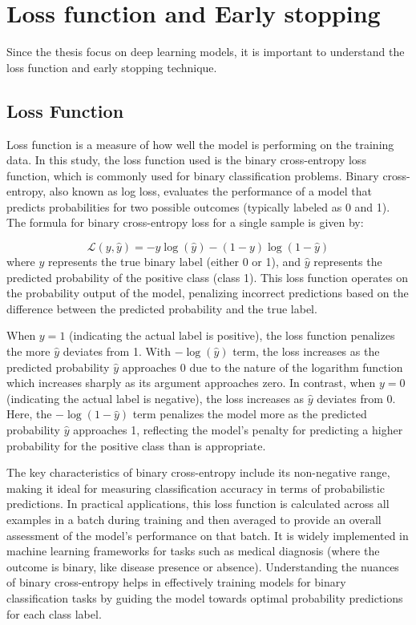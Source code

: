 \documentclass[../main.tex]{subfiles}
\begin{document}
\section{Loss function and Early stopping}

Since the thesis focus on deep learning models, it is important to understand the loss function and early stopping technique.


\subsection{Loss Function}

Loss function is a measure of how well the model is performing on the training data. In this study, the loss function used is the binary cross-entropy loss function, which is commonly used for binary classification problems.
Binary cross-entropy, also known as log loss, evaluates the performance of a model that predicts probabilities for two possible outcomes (typically labeled as 0 and 1). 
The formula for binary cross-entropy loss for a single sample is given by:

\begin{equation}
    \mathcal{L}(y, \hat{y}) = -y \log(\hat{y}) - (1 - y) \log(1 - \hat{y})
\end{equation}
where $y$ represents the true binary label (either 0 or 1), and $\hat{y}$ represents the predicted probability of the positive class (class 1).
This loss function operates on the probability output of the model, penalizing incorrect predictions based on the difference between the predicted probability and the true label.

When $y=1$ (indicating the actual label is positive), the loss function penalizes the more $\hat{y}$ deviates from 1.
With $- \log(\hat{y})$ term, the loss increases as the predicted probability $\hat{y}$ approaches 0 due to the nature of the logarithm function which increases sharply as its argument approaches zero.
In contrast, when $y=0$ (indicating the actual label is negative), the loss increases as $\hat{y}$ deviates from 0.
Here, the $- \log(1 - \hat{y})$ term penalizes the model more as the predicted probability $\hat{y}$ approaches 1, reflecting the model's penalty for predicting a higher probability for the positive class than is appropriate.

The key characteristics of binary cross-entropy include its non-negative range, making it ideal for measuring classification accuracy in terms of probabilistic predictions. 
In practical applications, this loss function is calculated across all examples in a batch during training and then averaged to provide an overall assessment of the model's performance on that batch. 
It is widely implemented in machine learning frameworks for tasks such as medical diagnosis (where the outcome is binary, like disease presence or absence). 
Understanding the nuances of binary cross-entropy helps in effectively training models for binary classification tasks by guiding the model towards optimal probability predictions for each class label.
\end{document}
